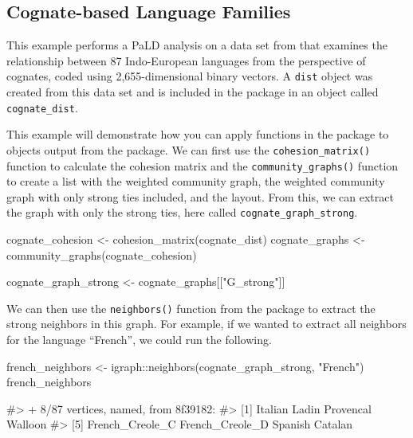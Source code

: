 \hypertarget{cognate-based-language-families}{%
\subsection{Cognate-based Language
Families}\label{cognate-based-language-families}}

This example performs a PaLD analysis on a data set from \citet{dyen92}
that examines the relationship between 87 Indo-European languages from
the perspective of cognates, coded using 2,655-dimensional binary
vectors. A \texttt{dist} object was created from this data set and is
included in the  package in an object called
\texttt{cognate\_dist}.

This example will demonstrate how you can apply functions in the
 package to objects output from the 
package. We can first use the \texttt{cohesion\_matrix()} function to
calculate the cohesion matrix and the \texttt{community\_graphs()}
function to create a list with the weighted community graph, the
weighted community graph with only strong ties included, and the layout.
From this, we can extract the graph with only the strong ties, here
called \texttt{cognate\_graph\_strong}.

\begin{Schunk}
\begin{Sinput}
cognate_cohesion <- cohesion_matrix(cognate_dist)
cognate_graphs <- community_graphs(cognate_cohesion)

cognate_graph_strong <- cognate_graphs[["G_strong"]]
\end{Sinput}
\end{Schunk}

We can then use the \texttt{neighbors()} function from the
 package to extract the strong neighbors in this graph.
For example, if we wanted to extract all neighbors for the language
``French'', we could run the following.

\begin{Schunk}
\begin{Sinput}
french_neighbors <- igraph::neighbors(cognate_graph_strong, "French")
french_neighbors
\end{Sinput}
\begin{Soutput}
#> + 8/87 vertices, named, from 8f39182:
#> [1] Italian         Ladin           Provencal       Walloon        
#> [5] French_Creole_C French_Creole_D Spanish         Catalan
\end{Soutput}
\end{Schunk}

